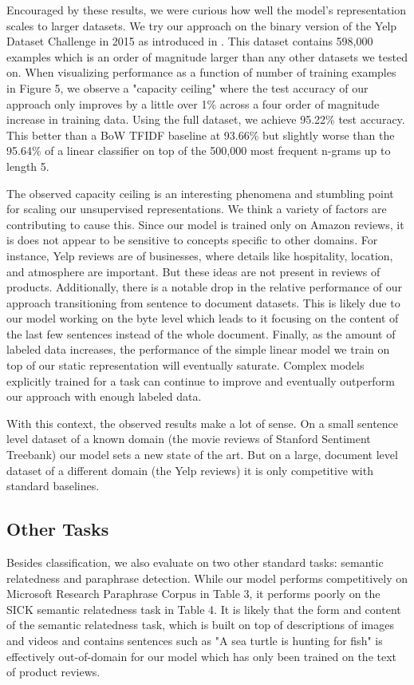 \documentclass{article}
\begin{document}
Encouraged by these results, we were curious how well the model's representation scales to larger datasets. We try our approach on the binary version of the Yelp Dataset Challenge in 2015 as introduced in \citet{zhang2015character}. This dataset contains 598,000 examples which is an order of magnitude larger than any other datasets we tested on. When visualizing performance as a function of number of training examples in Figure 5, we observe a "capacity ceiling" where the test accuracy of our approach only improves by a little over 1\% across a four order of magnitude increase in training data. Using the full dataset, we achieve 95.22\% test accuracy. This better than a BoW TFIDF baseline at 93.66\% but slightly worse than the 95.64\% of a linear classifier on top of the 500,000 most frequent n-grams up to length 5.

The observed capacity ceiling is an interesting phenomena and stumbling point for scaling our unsupervised representations. We think a variety of factors are contributing to cause this. Since our model is trained only on Amazon reviews, it is does not appear to be sensitive to concepts specific to other domains. For instance, Yelp reviews are of businesses, where details like hospitality, location, and atmosphere are important. But these ideas are not present in reviews of products. Additionally, there is a notable drop in the relative performance of our approach transitioning from sentence to document datasets. This is likely due to our model working on the byte level which leads to it focusing on the content of the last few sentences instead of the whole document. Finally, as the amount of labeled data increases, the performance of the simple linear model we train on top of our static representation will eventually saturate. Complex models explicitly trained for a task can continue to improve and eventually outperform our approach with enough labeled data.

With this context, the observed results make a lot of sense. On a small sentence level dataset of a known domain (the movie reviews of Stanford Sentiment Treebank) our model sets a new state of the art. But on a large, document level dataset of a different domain (the Yelp reviews) it is only competitive with standard baselines.

\subsection{Other Tasks}

Besides classification, we also evaluate on two other standard tasks: semantic relatedness and paraphrase detection. While our model performs competitively on Microsoft Research Paraphrase Corpus \cite{dolan2004unsupervised} in Table 3, it performs poorly on the SICK semantic relatedness task \cite{marelli2014semeval} in Table 4. It is likely that the form and content of the semantic relatedness task, which is built on top of descriptions of images and videos and contains sentences such as "A sea turtle is hunting for fish" is effectively out-of-domain for our model which has only been trained on the text of product reviews.
\end{document}
